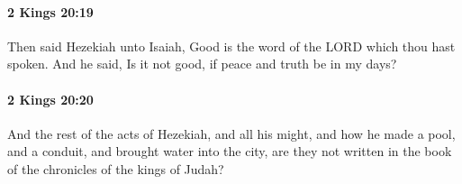 		\paragraph{2 Kings 20:19} %
			\label{2KINGS-20-19}

			Then said Hezekiah unto Isaiah, Good is the word of the LORD which thou hast spoken. And he said, Is it not good, if peace and truth be in my days?


		\paragraph{2 Kings 20:20} %
			\label{2KINGS-20-20}

			And the rest of the acts of Hezekiah, and all his might, and how he made a pool, and a conduit, and brought water into the city, are they not written in the book of the chronicles of the kings of Judah?


